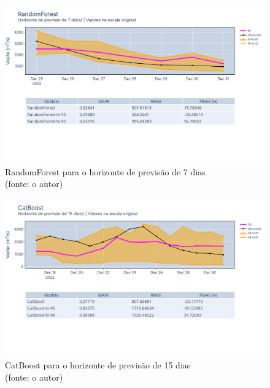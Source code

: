 \begin{figure}[!h]
	\centering
	\includegraphics[scale=0.33]{Figuras/jequiti/resultados/RandomForest_fh7.png}
	\caption{RandomForest para o horizonte de previsão de 7 dias\\(fonte: o autor)}
	\label{fig:jequiti_RandomForest_fh7}
\end{figure}

\begin{figure}[!h]
	\centering
	\includegraphics[scale=0.33]{Figuras/jequiti/resultados/CatBoost_fh15.png}
	\caption{CatBoost para o horizonte de previsão de 15 dias\\(fonte: o autor)}
	\label{fig:jequiti_CatBoostRegressor_fh15}
\end{figure}

